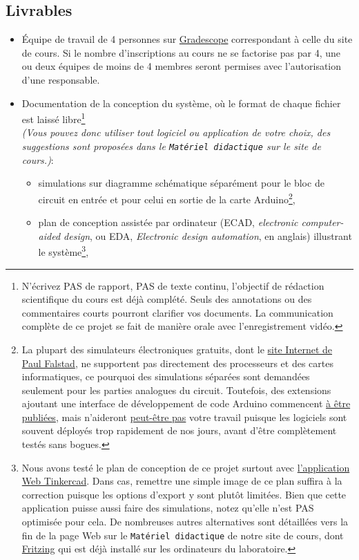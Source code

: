 \documentclass[english,french,12pt]{article}
\begin{document}
\subsection*{Livrables}
\label{subsec:livrables}
\vspace{-2ex}
\begin{itemize}
    \item Équipe de travail de 4 personnes sur \href{https://www.gradescope.com/}{Gradescope} correspondant à celle du site de cours. Si le nombre d'inscriptions au cours ne se factorise pas par 4, une ou deux équipes de moins de 4 membres seront permises avec l'autorisation d'une responsable.
    \item Documentation de la conception du système, où le format de chaque fichier est laissé libre\footnote{N'écrivez PAS de rapport, PAS de texte continu, l'objectif de rédaction scientifique du cours est déjà complété. Seuls des annotations ou des commentaires courts pourront clarifier vos documents. La communication complète de ce projet se fait de manière orale avec l'enregistrement vidéo.}\\ \textit{(Vous pouvez donc utiliser tout logiciel ou application de votre choix, des suggestions sont proposées dans le \texttt{Matériel didactique} sur le site de cours.)}:
    \begin{itemize}[label=$\bullet$]
        \item simulations sur diagramme schématique séparément pour le bloc de circuit en entrée et pour celui en sortie de la carte Arduino\footnote{La plupart des simulateurs électroniques gratuits, dont le \href{https://www.falstad.com/circuit/}{site Internet de Paul Falstad}, ne supportent pas directement des processeurs et des cartes informatiques, ce pourquoi des simulations séparées sont demandées seulement pour les parties analogues du circuit. Toutefois, des extensions ajoutant une interface de développement de code Arduino commencent \href{http://falstad.com/circuit/avr8js/}{à être publiées}, mais n'aideront \href{https://hackaday.com/2021/06/11/circuit-vr-arduino-virtually-meets-analog/}{peut-être pas} votre travail puisque les logiciels sont souvent déployés trop rapidement de nos jours, avant d'être complètement testés sans bogues.},
        \item plan de conception assistée par ordinateur (ECAD, \textit{electronic computer-aided design}, ou EDA, \textit{Electronic design automation}, en anglais) illustrant le système\footnote{Nous avons testé le plan de conception de ce projet surtout avec \href{https://www.tinkercad.com/login}{l'application Web Tinkercad}. Dans cas, remettre une simple image de ce plan suffira à la correction puisque les options d'export y sont plutôt limitées. Bien que cette application puisse aussi faire des simulations, notez qu'elle n'est PAS optimisée pour cela. De nombreuses autres alternatives sont détaillées vers la fin de la page Web sur le \texttt{Matériel didactique} de notre site de cours, dont \href{https://fritzing.org/}{Fritzing} qui est déjà installé sur les ordinateurs du laboratoire.},

\end{itemize}
\end{itemize}
\end{document}
